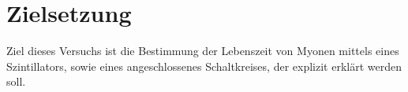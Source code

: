 \section{Zielsetzung}
\label{sec:Zielsetzung}

Ziel dieses Versuchs ist die Bestimmung der Lebenszeit von Myonen mittels eines Szintillators, sowie eines angeschlossenes Schaltkreises, der explizit erklärt werden soll.
